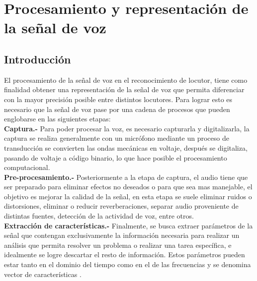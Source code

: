\chapter{Procesamiento y representaci\'on de la señal de voz} \label{chap:na}

\section{Introducci\'on}


El procesamiento de la señal de voz en el reconocimiento de locutor, tiene como finalidad obtener una representaci\'on de la señal de voz que permita diferenciar con la mayor precisi\'on posible entre distintos locutores. Para lograr esto es necesario que la señal de voz pase por una cadena de procesos que pueden englobarse en las siguientes etapas:\\

\textbf{Captura.-} Para poder procesar la voz, es necesario capturarla y digitalizarla, la captura se realiza generalmente con un micr\'ofono mediante un proceso de transducci\'on se convierten las ondas mec\'anicas en voltaje, despu\'es se digitaliza, pasando de voltaje a c\'odigo binario, lo que hace posible el procesamiento computacional.\\

\textbf{Pre-procesamiento.-} Posteriormente a la etapa de captura, el audio tiene que ser preparado para eliminar efectos no deseados o para que sea mas manejable, el objetivo es mejorar la calidad de la señal, en esta etapa se suele eliminar ruidos o distorsiones, eliminar o reducir reverberaciones, separar audio proveniente de distintas fuentes, detecci\'on de la actividad de voz, entre otros.\\ 

\textbf{Extracci\'on de caracter\'isticas.-} Finalmente, se busca extraer par\'ametros de la señal que contengan exclusivamente la informaci\'on necesaria para realizar un an\'alisis que permita resolver un problema o realizar una tarea espec\'ifica, e idealmente se logre descartar el resto de informaci\'on. Estos par\'ametros pueden estar tanto en el dominio del tiempo como en el de las frecuencias y se denomina vector de caracter\'isticas \cite{schuller}.\\
\indent


